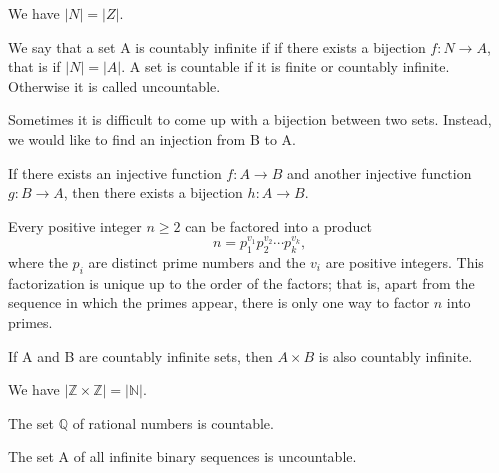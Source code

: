 \documentclass{tufte-handout}
\begin{document}

\begin{Theorem}
    We have \( \left|N\right| = \left|Z \right| \).
\end{Theorem}

We say that a set A is countably infinite if if there exists a bijection \( f:N\to A \), that is
if \( \left|N\right| = \left|A\right| \). A set is countable if it is finite or countably infinite.
Otherwise it is called uncountable.

Sometimes it is difficult to come up with a bijection between two sets. Instead,
we would like to find an injection from B to A.

\begin{Theorem}
    If there exists an injective function \( f:A\to B \) and another injective function \( g:B\to A \),
    then there exists a bijection \( h:A\to B \).
\end{Theorem}

\begin{Theorem}
Every positive integer \( n \geq 2 \) can be factored into a product
\[
n = p_1^{v_1} p_2^{v_2} \cdots p_k^{v_k},
\]
where the \( p_i \) are distinct prime numbers and the \( v_i \) are positive integers.
 This factorization is unique up to the order of the factors; 
 that is, apart from the sequence in which the primes appear, there is
  only one way to factor \( n \) into primes.
\end{Theorem}
    
\begin{Theorem}
    If A and B are countably infinite sets, then \( A \times B\) is also
    countably infinite.
\end{Theorem}

\begin{Corollary}
    We have \( \left| \mathbb{Z} \times \mathbb{Z} \right| = \left| \mathbb{N} \right| \).
\end{Corollary}

\begin{Theorem}
    The set \( \mathbb{Q} \) of rational numbers is countable.
\end{Theorem}

\begin{Theorem}
    The set A of all infinite binary sequences is uncountable.
\end{Theorem}
\end{document}
